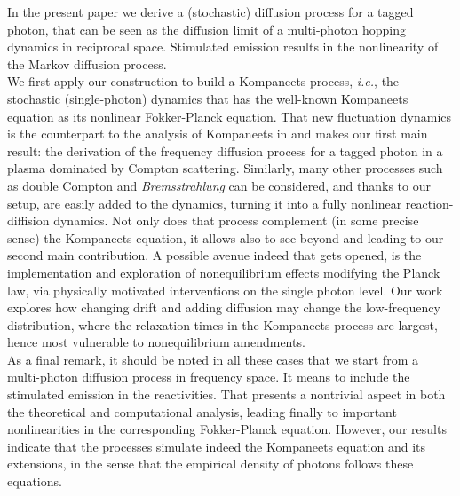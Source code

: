 \documentclass[a4paper,12pt,reqno,superscriptaddress,nofootinbib]{revtex4}
\newcommand{\0}{^{(0)}}
\newcommand{\1}{^{(1)}}
\newcommand{\2}{^{(2)}}
\begin{document}
In the present paper  we derive a (stochastic) diffusion process for a tagged photon, that can be seen as the diffusion limit of a multi-photon hopping dynamics in reciprocal space.  Stimulated emission results in the nonlinearity of the Markov diffusion process.\\ 
  We first apply our construction to build a Kompaneets process, {\it i.e.}, the stochastic (single-photon) dynamics that has the well-known Kompaneets equation as its nonlinear Fokker-Planck equation.
That new fluctuation dynamics  is the counterpart to the analysis of Kompaneets in \cite{kompa} and makes our first main result: the derivation of the frequency diffusion process for a tagged photon in a plasma dominated by Compton scattering.  Similarly, many other processes such as double Compton and  \textit{Bremsstrahlung} can be considered, and thanks to our setup, are easily added to the dynamics, turning it into a fully nonlinear reaction-diffision dynamics.  Not only does that process complement (in some precise sense) the Kompaneets equation, it allows also to see beyond and leading to our second main contribution.  A possible avenue indeed that gets opened, is the implementation and exploration of nonequilibrium effects modifying the Planck law, via physically motivated interventions on the single photon level. Our work explores how changing drift and adding diffusion may change the low-frequency distribution, where the relaxation times in the Kompaneets process are largest, hence most vulnerable to nonequilibrium amendments.\\
As a final remark, it should be noted in all these cases that we start from a multi-photon diffusion process in frequency space.  It means to include the stimulated emission in the reactivities. That presents a nontrivial aspect in both the theoretical and computational analysis, leading finally to important nonlinearities in the corresponding Fokker-Planck equation. However, our results indicate that the processes simulate indeed the Kompaneets equation and its extensions, in the sense that the empirical density of photons follows these equations.
\end{document}

